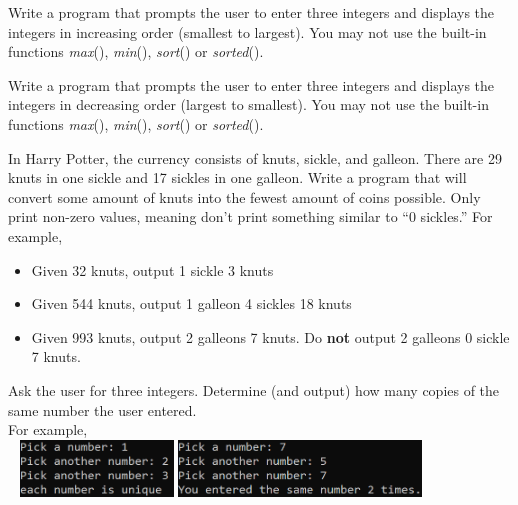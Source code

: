 

	\item  
		Write a program that prompts the user to enter three integers and displays the integers 
		in increasing order (smallest to largest).  You may not use the built-in functions 
		\textit{max}(), \textit{min}(), \textit{sort}() or \textit{sorted}().


	\item  
		Write a program that prompts the user to enter three integers and displays the integers 
		in decreasing order (largest to smallest).  You may not use the built-in functions 
		\textit{max}(), \textit{min}(), \textit{sort}() or \textit{sorted}().


	\item  
		In Harry Potter, the currency consists of knuts, sickle, and galleon.  There are 29 knuts in 
		one sickle and 17 sickles in one galleon.  Write a program that will convert some amount of 
		knuts into the fewest amount of coins possible.  Only print non-zero values, meaning don't 
		print something similar to ``0 sickles.''  For example,
		\begin{itemize}
			\item Given 32 knuts, output 1 sickle 3 knuts
			\item Given 544 knuts, output 1 galleon 4 sickles 18 knuts
			\item Given 993 knuts, output 2 galleons 7 knuts. 
				Do \textbf{not} output 2 galleons 0 sickle 7 knuts.
		\end{itemize}




	\item  
		Ask the user for three integers.  Determine (and output) how many copies of the same number 
		the user entered.\\
		For example, \\ \ \hfill
		\includegraphics[height = 0.6in]{./imgs/uniqueIntCount1.PNG} \hfill
		\includegraphics[height = 0.6in]{./imgs/uniqueIntCount2.PNG} \hfill \ 

